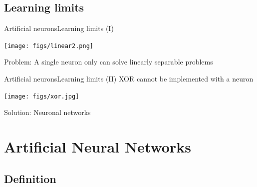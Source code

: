 \documentclass[10pt,compress]{beamer} %
\begin{document}
\subsection{Learning limits}
\begin{frame}{Artificial neurons}{Learning limits (I)}
	\begin{center}
	\texttt{[image: figs/linear2.png]}
	\end{center}
	Problem: A single neuron only can solve linearly separable problems
\end{frame}

\begin{frame}{Artificial neurons}{Learning limits (II)}
	XOR cannot be implemented with a neuron
	\begin{center}
	\texttt{[image: figs/xor.jpg]}
	\end{center}
	Solution: Neuronal networks
\end{frame}

\section{Artificial Neural Networks}
\subsection{Definition}
\end{document}
